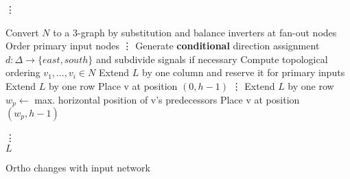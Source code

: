\begin{algorithm}[H]
	\vdots
	
	\begin{algorithmic}
		\State Convert $N$ to a 3-graph by substitution and balance inverters at fan-out nodes
		\State Order primary input nodes
		\State \vdots
		\State Generate \textbf{conditional} direction assignment $d : \Delta \rightarrow \{east, south\}$ and subdivide signals if necessary
		\State Compute topological ordering $v_1, . . . , v_i \in N$
		\State Extend $L$ by one column and reserve it for primary inputs
		\State Extend $L$ by one row
		\State Place v at position $(0, h - 1)$
		\State \vdots
		\State Extend $L$ by one row
		\EndIf
		\State $w_p \leftarrow$ max. horizontal position of v's predecessors
		\State Place v at position $(w _p, h - 1)$
		\EndIf
		
		\EndFor
		\State \vdots \\
		\Return $L$
	\end{algorithmic}
	\caption{Ortho changes with input network}\label{alg:input_network}
\end{algorithm}

